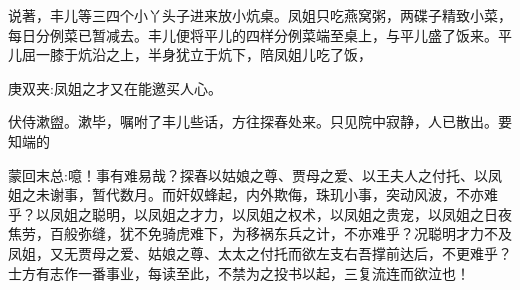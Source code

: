\begin{parag}
    说著，丰儿等三四个小丫头子进来放小炕桌。凤姐只吃燕窝粥，两碟子精致小菜，每日分例菜已暂减去。丰儿便将平儿的四样分例菜端至桌上，与平儿盛了饭来。平儿屈一膝于炕沿之上，半身犹立于炕下，陪凤姐儿吃了饭，\begin{note}庚双夹:凤姐之才又在能邀买人心。\end{note}伏侍漱盥。漱毕，嘱咐了丰儿些话，方往探春处来。只见院中寂静，人已散出。要知端的
\end{parag}


\begin{parag}
    \begin{note}蒙回末总:噫！事有难易哉？探春以姑娘之尊、贾母之爱、以王夫人之付托、以凤姐之未谢事，暂代数月。而奸奴蜂起，内外欺侮，珠玑小事，突动风波，不亦难乎？以凤姐之聪明，以凤姐之才力，以凤姐之权术，以凤姐之贵宠，以凤姐之日夜焦劳，百般弥缝，犹不免骑虎难下，为移祸东兵之计，不亦难乎？况聪明才力不及凤姐，又无贾母之爱、姑娘之尊、太太之付托而欲左支右吾撑前达后，不更难乎？士方有志作一番事业，每读至此，不禁为之投书以起，三复流连而欲泣也！\end{note}
\end{parag}
